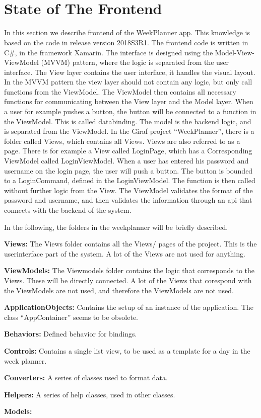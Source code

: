 \section{\\State of The Frontend} \label{sec:StateFrontend}

In this section we describe frontend of the WeekPlanner app. This knowledge is based on the code in release version 2018S3R1. 
The frontend code is written in C\#, in the framework Xamarin. The interface is designed using the Model-View-ViewModel (MVVM) pattern, where the logic is separated from the user interface. The View layer contains the user interface, it handles the visual layout. In the MVVM pattern the view layer should not contain any logic, but only call functions from the ViewModel. The ViewModel then contains all necessary functions for communicating between the View layer and the Model layer. When a user for example pushes a button, the button will be connected to a function in the ViewModel. This is called databinding. 
The model is the backend logic, and is separated from the ViewModel. 
In the Giraf project “WeekPlanner”, there is a folder called Views, which contains all Views. Views are also referred to as a page. There is for example a View called LoginPage, which has a Corresponding ViewModel called LoginViewModel.
When a user has entered his password and username on the login page, the user will push a button. The button is bounded to a LoginCommand, defined in the LoginViewModel. The function is then called without further logic from the View. The ViewModel validates the format of the password and username, and then validates the information through an api that connects with the backend of the system. 

In the following, the folders in the weekplanner will be briefly described.

\textbf{Views:}
The Views folder contains all the Views/ pages of the project. This is the userinterface part of the system. A lot of the Views are not used for anything. 

\textbf{ViewModels:}
The Viewmodels folder contains the logic that corresponds to the Views. These will be directly connected. A lot of the Views that corespond with the ViewModels are not used, and therefore the ViewModels are not used.

\textbf{ApplicationObjects:}
Contains the setup of an instance of the application. The class “AppContainer” seems to be obsolete. 

\textbf{Behaviors: }
Defined behavior for bindings. 

\textbf{Controls:}
Contains a single list view, to be used as a template for a day in the week planner. 

\textbf{Converters:} 
A series of classes used to format data. 

\textbf{Helpers: }
A series of help classes, used in other classes. 

\textbf{Models:}
